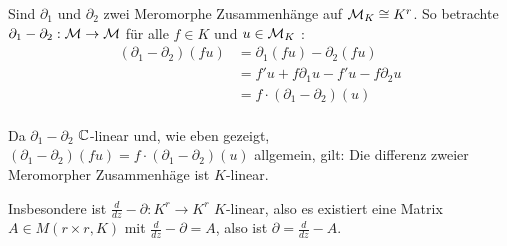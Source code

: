 Sind $\partial_1$ und $\partial_2$ zwei Meromorphe Zusammenhänge auf $\mathcal{M}_K\cong
K^r$. So betrachte $\partial_1-\partial_2:\mathcal{M}\rightarrow\mathcal{M}$ für alle $f\in K$ 
und $u\in \mathcal{M}_K$ :
\begin{align*}
  (\partial_1-\partial_2)(fu) &= \partial_1(fu)-\partial_2(fu)\\
  &= f'u+f\partial_1u-f'u-f\partial_2u\\
  &= f\cdot(\partial_1-\partial_2)(u)\\
\end{align*}
\begin{lem}
  Da $\partial_1-\partial_2$ $\mathbb{C}$-linear und, wie eben gezeigt,
  $(\partial_1-\partial_2)(fu)=f\cdot(\partial_1-\partial_2)(u)$ allgemein,
  gilt: Die differenz zweier Meromorpher Zusammenhäge ist $K$-linear.
\end{lem}
Insbesondere ist $\frac{d}{dz}-\partial:K^r\rightarrow K^r$ $K$-linear, also es
existiert eine Matrix $A\in M(r\times r,K)$ mit $\frac{d}{dz}-\partial=A$, also
ist $\partial=\frac{d}{dz}-A$.



